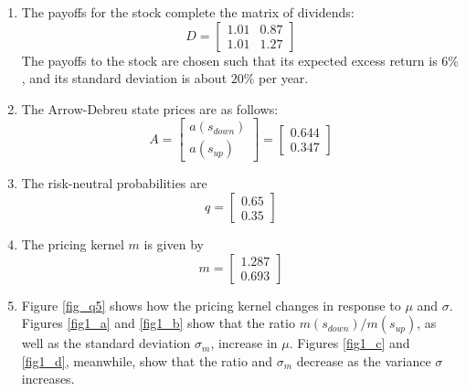 \documentclass[11pt]{article}
\begin{document}
\begin{enumerate}
\begin{enumerate}
			\item The payoffs for the stock complete the matrix of dividends: 
			\[ D = \begin{bmatrix}
			1.01 & 0.87 \\ 1.01 & 1.27
			\end{bmatrix}\]
			The payoffs to the stock are chosen such that its expected excess return is $ 6\% $, and its standard deviation is about $ 20\% $ per year. 
			
			\item The Arrow-Debreu state prices are as follows:
			\[A = \begin{bmatrix} a(s_{down}) \\ a(s_{up})\end{bmatrix} = \begin{bmatrix} 0.644 \\ 0.347 \end{bmatrix}\]
			
			\item The risk-neutral probabilities are 
			\[q = \begin{bmatrix}
			0.65 \\ 0.35
			\end{bmatrix}\]
			
			\item The pricing kernel $ m $ is given by 
			\[m = \begin{bmatrix}
			1.287 \\ 0.693
			\end{bmatrix}\]
			
			\item Figure \ref{fig_q5} shows how the pricing kernel changes in response to $\mu$ and $\sigma$. Figures \ref{fig1_a} and \ref{fig1_b} show that the ratio $ m(s_{down}) / m(s_{up}) $, as well as the standard deviation $\sigma_m$, increase in $\mu$. Figures \ref{fig1_c} and \ref{fig1_d}, meanwhile, show that the ratio and $\sigma_m$ decrease as the variance $\sigma$ increases. 
			

\end{enumerate}
\end{enumerate}
\end{document}
